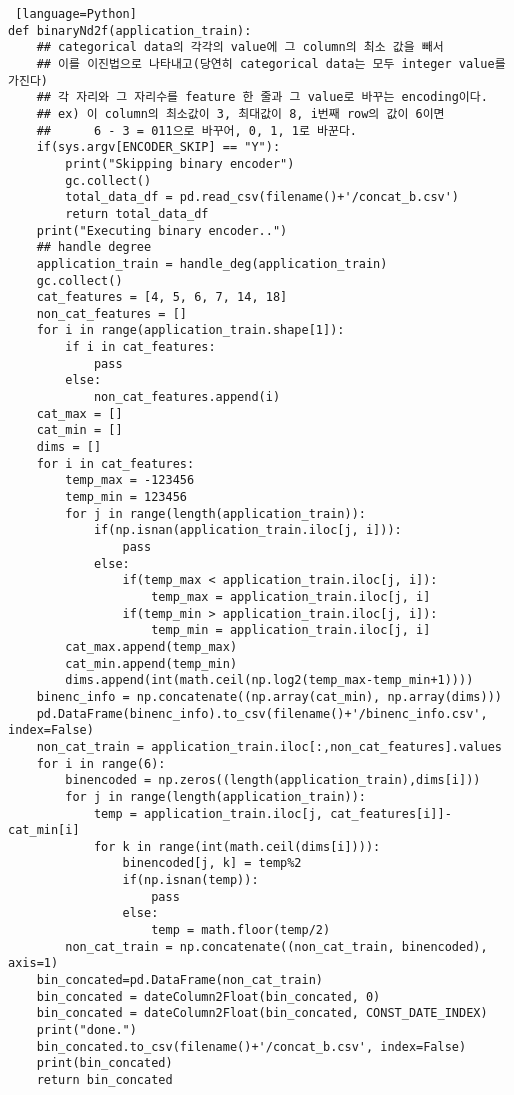 \documentclass{article}
\begin{document}
\begin{lstlisting} [language=Python]
def binaryNd2f(application_train):
    ## categorical data의 각각의 value에 그 column의 최소 값을 빼서
    ## 이를 이진법으로 나타내고(당연히 categorical data는 모두 integer value를 가진다)
    ## 각 자리와 그 자리수를 feature 한 줄과 그 value로 바꾸는 encoding이다.
    ## ex) 이 column의 최소값이 3, 최대값이 8, i번째 row의 값이 6이면
    ##      6 - 3 = 011으로 바꾸어, 0, 1, 1로 바꾼다.
    if(sys.argv[ENCODER_SKIP] == "Y"):
        print("Skipping binary encoder")
        gc.collect()
        total_data_df = pd.read_csv(filename()+'/concat_b.csv')
        return total_data_df
    print("Executing binary encoder..")
    ## handle degree
    application_train = handle_deg(application_train)
    gc.collect()
    cat_features = [4, 5, 6, 7, 14, 18]
    non_cat_features = []
    for i in range(application_train.shape[1]):
        if i in cat_features:
            pass
        else:
            non_cat_features.append(i)
    cat_max = []
    cat_min = []
    dims = []
    for i in cat_features:
        temp_max = -123456
        temp_min = 123456
        for j in range(length(application_train)):
            if(np.isnan(application_train.iloc[j, i])):
                pass
            else:
                if(temp_max < application_train.iloc[j, i]):
                    temp_max = application_train.iloc[j, i]
                if(temp_min > application_train.iloc[j, i]):
                    temp_min = application_train.iloc[j, i]
        cat_max.append(temp_max)
        cat_min.append(temp_min)
        dims.append(int(math.ceil(np.log2(temp_max-temp_min+1))))
    binenc_info = np.concatenate((np.array(cat_min), np.array(dims)))
    pd.DataFrame(binenc_info).to_csv(filename()+'/binenc_info.csv', index=False)
    non_cat_train = application_train.iloc[:,non_cat_features].values
    for i in range(6):
        binencoded = np.zeros((length(application_train),dims[i]))
        for j in range(length(application_train)):
            temp = application_train.iloc[j, cat_features[i]]-cat_min[i]
            for k in range(int(math.ceil(dims[i]))):
                binencoded[j, k] = temp%2
                if(np.isnan(temp)):
                    pass
                else:
                    temp = math.floor(temp/2)
        non_cat_train = np.concatenate((non_cat_train, binencoded), axis=1)
    bin_concated=pd.DataFrame(non_cat_train)
    bin_concated = dateColumn2Float(bin_concated, 0)        
    bin_concated = dateColumn2Float(bin_concated, CONST_DATE_INDEX)
    print("done.")
    bin_concated.to_csv(filename()+'/concat_b.csv', index=False)
    print(bin_concated)
    return bin_concated


\end{lstlisting}
\end{document}
